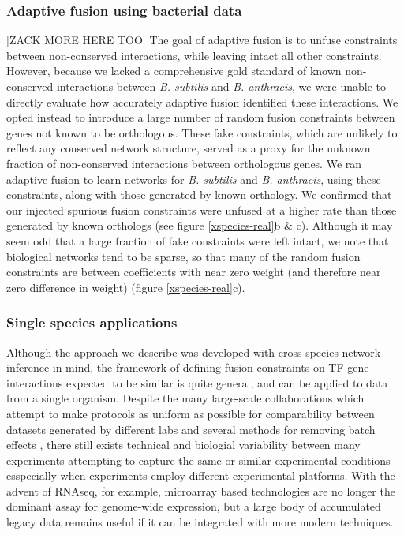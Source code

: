 \documentclass[11pt]{article}
\begin{document}
\subsubsection{Adaptive fusion using bacterial data}
[ZACK MORE HERE TOO]
 The goal of adaptive fusion is to unfuse constraints between non-conserved interactions, while leaving intact all other constraints. 
 However, because we lacked a comprehensive gold standard of known non-conserved interactions between \textit{B. subtilis} and \textit{B. anthracis}, we were unable to directly evaluate how accurately adaptive fusion identified these interactions.
  We opted instead to introduce a large number of random fusion constraints between genes not known to be orthologous. 
 These fake constraints, which are unlikely to reflect any conserved network structure, served as a proxy for the unknown fraction of non-conserved interactions between orthologous genes. 
 We ran adaptive fusion to learn networks for \textit{B. subtilis} and \textit{B. anthracis}, using these constraints, along with those generated by known orthology. 
 We confirmed that our injected spurious fusion constraints were unfused at a higher rate than those generated by known orthologs (see figure \ref{xspecies-real}b & c). 
 Although it may seem odd that a large fraction of fake constraints were left intact, we note that biological networks tend to be sparse, so that many of the random fusion constraints are between coefficients with near zero weight (and therefore near zero difference in weight) (figure \ref{xspecies-real}c). 


 \subsubsection{Single species applications}
 
Although the approach we describe was developed with cross-species network inference in mind, the framework of defining fusion constraints on TF-gene interactions expected to be similar is quite general, and can be applied to data from a single organism. Despite the many large-scale collaborations which attempt to make protocols as uniform as possible for comparability between datasets generated by different labs \cite{paten_nih_2015,kundaje_integrative_2015} and several methods for removing batch effects \cite{irizarry_exploration_2003,johnson_adjusting_2007}, there still exists technical and biologial variability between many experiments attempting to capture the same or similar experimental conditions esspecially when experiments employ different experimental platforms. 
With the advent of RNAseq, for example, microarray based technologies are no longer the dominant assay for genome-wide expression, but a large body of accumulated legacy data remains useful if it can be integrated with more modern techniques.
\end{document}

